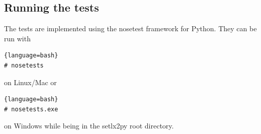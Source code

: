 \clearpage
\subsection{Running the tests}

The tests are implemented using the nosetest framework for Python. They can be run with

\begin{lstlisting}{language=bash}
# nosetests 
\end{lstlisting}

on Linux/Mac or 

\begin{lstlisting}{language=bash}
# nosetests.exe
\end{lstlisting}

on Windows while being in the setlx2py root directory.

